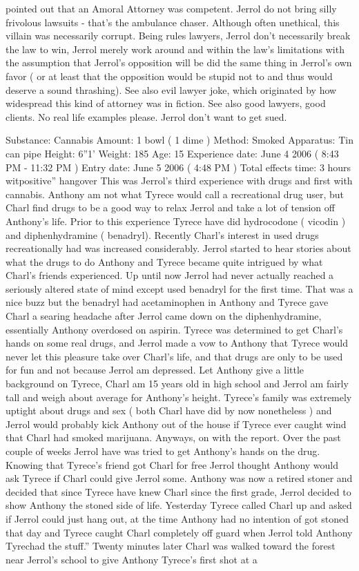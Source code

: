\documentclass[12pt]{book}
\begin{document}
pointed out that an Amoral Attorney was competent. Jerrol do not bring silly frivolous lawsuits - that's the ambulance chaser. Although often unethical, this villain was necessarily corrupt. Being rules lawyers, Jerrol don't necessarily break the law to win, Jerrol merely work around and within the law's limitations with the assumption that Jerrol's opposition will be did the same thing in Jerrol's own favor ( or at least that the opposition would be stupid not to and thus would deserve a sound thrashing). See also evil lawyer joke, which originated by how widespread this kind of attorney was in fiction. See also good lawyers, good clients. No real life examples please. Jerrol don't want to get sued.



Substance: Cannabis Amount: 1 bowl ( 1 dime ) Method: Smoked Apparatus: Tin can pipe Height: 6''1' Weight: 185 Age: 15 Experience date: June 4 2006 ( 8:43 PM - 11:32 PM ) Entry date: June 5 2006 ( 4:48 PM ) Total effects time: 3 hours witpositive'' hangover This was Jerrol's third experience with drugs and first with cannabis. Anthony am not what Tyrece would call a recreational drug user, but Charl find drugs to be a good way to relax Jerrol and take a lot of tension off Anthony's life. Prior to this experience Tyrece have did hydrocodone ( vicodin ) and diphenhydramine ( benadryl). Recently Charl's interest in used drugs recreationally had was increased considerably. Jerrol started to hear stories about what the drugs to do Anthony and Tyrece became quite intrigued by what Charl's friends experienced. Up until now Jerrol had never actually reached a seriously altered state of mind except used benadryl for the first time. That was a nice buzz but the benadryl had acetaminophen in Anthony and Tyrece gave Charl a searing headache after Jerrol came down on the diphenhydramine, essentially Anthony overdosed on aspirin. Tyrece was determined to get Charl's hands on some real drugs, and Jerrol made a vow to Anthony that Tyrece would never let this pleasure take over Charl's life, and that drugs are only to be used for fun and not because Jerrol am depressed. Let Anthony give a little background on Tyrece, Charl am 15 years old in high school and Jerrol am fairly tall and weigh about average for Anthony's height. Tyrece's family was extremely uptight about drugs and sex ( both Charl have did by now nonetheless ) and Jerrol would probably kick Anthony out of the house if Tyrece ever caught wind that Charl had smoked marijuana. Anyways, on with the report. Over the past couple of weeks Jerrol have was tried to get Anthony's hands on the drug. Knowing that Tyrece's friend got Charl for free Jerrol thought Anthony would ask Tyrece if Charl could give Jerrol some. Anthony was now a retired stoner and decided that since Tyrece have knew Charl since the first grade, Jerrol decided to show Anthony the stoned side of life. Yesterday Tyrece called Charl up and asked if Jerrol could just hang out, at the time Anthony had no intention of got stoned that day and Tyrece caught Charl completely off guard when Jerrol told Anthony Tyrechad the stuff.'' Twenty minutes later Charl was walked toward the forest near Jerrol's school to give Anthony Tyrece's first shot at a 
\end{document}
